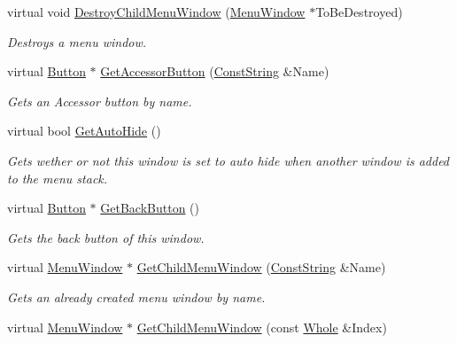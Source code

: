 \begin{DoxyCompactItemize}
virtual void \hyperlink{classMezzanine_1_1UI_1_1MenuWindow_a9798a05738ab5977d32b06c7fdc0ea29}{DestroyChildMenuWindow} (\hyperlink{classMezzanine_1_1UI_1_1MenuWindow}{MenuWindow} $\ast$ToBeDestroyed)
\begin{DoxyCompactList}\small\item\em Destroys a menu window. \item\end{DoxyCompactList}\item 
virtual \hyperlink{classMezzanine_1_1UI_1_1Button}{Button} $\ast$ \hyperlink{classMezzanine_1_1UI_1_1MenuWindow_ae3121c7545f1a5c4f97cf1dbeb8d465b}{GetAccessorButton} (\hyperlink{namespaceMezzanine_a63cd699ac54b73953f35ec9cfc05e506}{ConstString} \&Name)
\begin{DoxyCompactList}\small\item\em Gets an Accessor button by name. \item\end{DoxyCompactList}\item 
virtual bool \hyperlink{classMezzanine_1_1UI_1_1MenuWindow_a22942d0517af60c97d39c8f1bead9bc4}{GetAutoHide} ()
\begin{DoxyCompactList}\small\item\em Gets wether or not this window is set to auto hide when another window is added to the menu stack. \item\end{DoxyCompactList}\item 
virtual \hyperlink{classMezzanine_1_1UI_1_1Button}{Button} $\ast$ \hyperlink{classMezzanine_1_1UI_1_1MenuWindow_a32f4d1543e0e1b0fb129440dec15e0a5}{GetBackButton} ()
\begin{DoxyCompactList}\small\item\em Gets the back button of this window. \item\end{DoxyCompactList}\item 
virtual \hyperlink{classMezzanine_1_1UI_1_1MenuWindow}{MenuWindow} $\ast$ \hyperlink{classMezzanine_1_1UI_1_1MenuWindow_a14140441dfe2c63a56e6e6c002e5542d}{GetChildMenuWindow} (\hyperlink{namespaceMezzanine_a63cd699ac54b73953f35ec9cfc05e506}{ConstString} \&Name)
\begin{DoxyCompactList}\small\item\em Gets an already created menu window by name. \item\end{DoxyCompactList}\item 
virtual \hyperlink{classMezzanine_1_1UI_1_1MenuWindow}{MenuWindow} $\ast$ \hyperlink{classMezzanine_1_1UI_1_1MenuWindow_a453ef6af9762de3d29d705501398274a}{GetChildMenuWindow} (const \hyperlink{namespaceMezzanine_adcbb6ce6d1eb4379d109e51171e2e493}{Whole} \&Index)

\end{DoxyCompactItemize}
